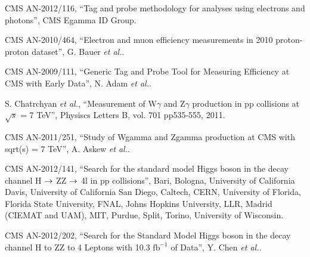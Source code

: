 \clearpage

\vspace*{-0.2cm}

 CMS AN-2012/116, ``Tag and probe methodology for analyses using electrons and photons'',
CMS Egamma ID Group.

 CMS AN-2010/464, ``Electron and muon efficiency measurements in 2010 proton-proton dataset'',
G. Bauer \textit{et al.}.

 CMS AN-2009/111, ``Generic Tag and Probe Tool for Measuring Efficiency at CMS with Early Data'',
N. Adam \textit{et al.}.

S. Chatrchyan \textit{et al.}, ``Measurement of W$\gamma$ and Z$\gamma$ production in pp collisions at $\sqrt{s}$ = 7 TeV'', Physiscs Letters B, vol. 701 pp535-555, 2011.

CMS AN-2011/251, ``Study of Wgamma and Zgamma production at CMS with sqrt(s) = 7 TeV'', 
A. Askew \textit{et al.}.

CMS AN-2012/141, ``Search for the standard model Higgs boson in the decay channel H $\rightarrow$ ZZ $\rightarrow$ 4l in pp collisions'', 
Bari, Bologna, University of California Davis, University of California San Diego, Caltech,
CERN, University of Florida, Florida State University, FNAL, Johns Hopkins University, LLR,
Madrid (CIEMAT and UAM), MIT, Purdue, Split, Torino, University of Wisconsin.

CMS AN-2012/202, ``Search for the Standard Model Higgs boson in the decay channel H to ZZ to 4 Leptons with 10.3 $\mathrm{fb}^{-1}$ of Data'', 
Y. Chen \textit{et al.}.